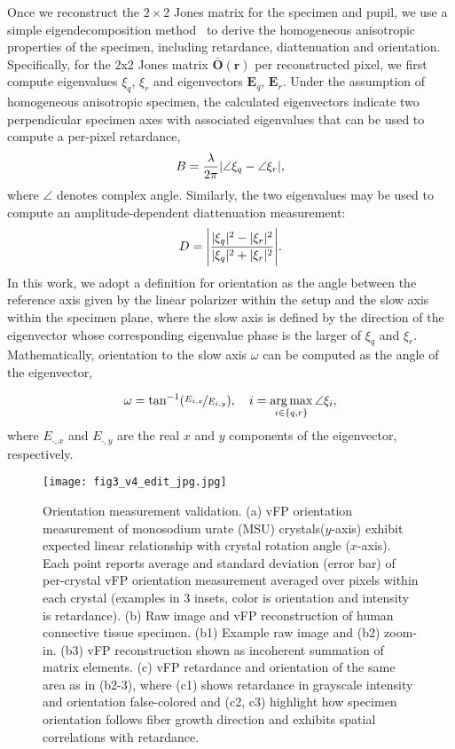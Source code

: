 \documentclass{article}
\DeclarePairedDelimiter\abs{\lvert}{\rvert}%
\providecommand{\vrr}{\mathbf{r}}
\providecommand{\mO}{\mathbf{O}}
\DeclareMathOperator*{\argmax}{arg\,max}
\begin{document}
Once we reconstruct the $2\times2$ Jones matrix for the specimen and pupil, we use a simple eigendecomposition method~\cite{chipman2018polarized} to derive the homogeneous anisotropic properties of the specimen, including retardance, diattenuation and orientation. Specifically, for the 2x2 Jones matrix $\bar{\mO}(\vrr)$ per reconstructed pixel, we first compute eigenvalues $\xi_q$, $\xi_r$ and eigenvectors $\mathbf{E}_q$, $\mathbf{E}_r$. Under the assumption of homogeneous anisotropic specimen, the calculated eigenvectors indicate two perpendicular specimen axes with associated eigenvalues that can be used to compute a per-pixel retardance,
\begin{equation}
    B = \frac{\lambda}{2\pi}\abs{\angle\xi_q-\angle\xi_r},
\end{equation}
where $\angle$ denotes complex angle. Similarly, the two eigenvalues may be used to compute an amplitude-dependent diattenuation measurement:
\begin{equation}
    D=\Bigg\lvert\frac{\abs{\xi_q}^2-\abs{\xi_r}^2}{\abs{\xi_q}^2+\abs{\xi_r}^2}\Bigg\rvert.
\end{equation}
In this work, we adopt a definition for orientation as the angle between the reference axis given by the linear polarizer within the setup and the slow axis within the specimen plane, where the slow axis is defined by the direction of the eigenvector whose corresponding eigenvalue phase is the larger of $\xi_q$ and $\xi_r$. Mathematically, orientation to the slow axis $\omega$ can be computed as the angle of the eigenvector,

\begin{equation}
    \omega = \tan^{-1}(\nicefrac{{E}_{i,x}}{{E}_{i,y}}), \quad i= \argmax_{i\in\{q,r\}}\angle\xi_i,
\end{equation}
where $E_{\cdot,x}$ and $E_{\cdot,y}$ are the real $x$ and $y$ components of the eigenvector, respectively.


\begin{figure*}[t!]
\begin{center}
    \texttt{[image: fig3\_v4\_edit\_jpg.jpg]} 
    \caption{Orientation measurement validation. (a) vFP orientation measurement of monosodium urate (MSU) crystals($y$-axis) exhibit expected linear relationship with crystal rotation angle ($x$-axis). Each point reports average and standard deviation (error bar) of per-crystal vFP orientation measurement averaged over pixels within each crystal (examples in 3 insets, color is orientation and intensity is retardance). (b) Raw image and vFP reconstruction of human connective tissue specimen. (b1) Example raw image and (b2) zoom-in. (b3) vFP reconstruction shown as incoherent summation of matrix elements. (c) vFP retardance and orientation of the same area as in (b2-3), where (c1) shows retardance in grayscale intensity and orientation false-colored and (c2, c3) highlight how specimen orientation follows fiber growth direction and exhibits spatial correlations with retardance.}
    \label{Fig.3}
\end{center}
\end{figure*}
\end{document}
